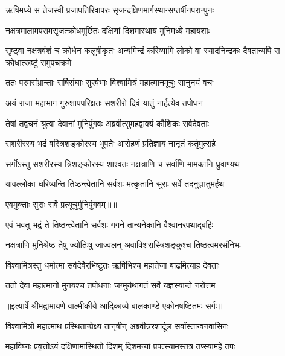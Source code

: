 \twolineshloka
{ऋषिमध्ये स तेजस्वी प्रजापतिरिवापरः}
{सृजन्दक्षिणमार्गस्थान्सप्तर्षीनपरान्पुनः} %

\twolineshloka
{नक्षत्रमालामपरामसृजत्क्रोधमूर्छितः}
{दक्षिणां दिशमास्थाय मुनिमध्ये महायशाः} %

\threelineshloka
{सृष्ट्वा नक्षत्रवंशं च क्रोधेन कलुषीकृतः}
{अन्यमिन्द्रं करिष्यामि लोको वा स्यादनिन्द्रकः}
{दैवतान्यपि स क्रोधात्स्रष्टुं समुपचक्रमे} %

\twolineshloka
{ततः परमसंभ्रान्ताः सर्षिसंघाः सुरर्षभाः}
{विश्वामित्रं महात्मानमूचुः सानुनयं वचः} %

\twolineshloka
{अयं राजा महाभाग गुरुशापपरिक्षतः}
{सशरीरो दिवं यातुं नार्हत्येव तपोधन} %

\twolineshloka
{तेषां तद्वचनं श्रुत्वा देवानां मुनिपुंगवः}
{अब्रवीत्सुमहद्वाक्यं कौशिकः सर्वदेवताः} %

\twolineshloka
{सशरीरस्य भद्रं वस्त्रिशङ्कोरस्य भूपतेः}
{आरोहणं प्रतिज्ञाय नानृतं कर्तुमुत्सहे} %

\twolineshloka
{सर्गोऽस्तु सशरीरस्य त्रिशङ्कोरस्य शाश्वतः}
{नक्षत्राणि च सर्वाणि मामकानि ध्रुवाण्यथ} %

\twolineshloka
{यावल्लोका धरिष्यन्ति तिष्ठन्त्वेतानि सर्वशः}
{मत्कृतानि सुराः सर्वे तदनुज्ञातुमर्हथ} %

{एवमुक्ताः सुराः सर्वे प्रत्यूचुर्मुनिपुंगवम्॥॥} %

\addtocounter{shlokacount}{1}

\twolineshloka
{एवं भवतु भद्रं ते तिष्ठन्त्वेतानि सर्वशः}
{गगने तान्यनेकानि वैश्वानरपथाद्बहिः} %

\twolineshloka
{नक्षत्राणि मुनिश्रेष्ठ तेषु ज्योतिःषु जाज्वलन्}
{अवाक्शिरास्त्रिशङ्कुश्च तिष्ठत्वमरसंनिभः} %

\twolineshloka
{विश्वामित्रस्तु धर्मात्मा सर्वदेवैरभिष्टुतः}
{ऋषिभिश्च महातेजा बाढमित्याह देवताः} %

\twolineshloka
{ततो देवा महात्मानो मुनयश्च तपोधनाः}
{जग्मुर्यथागतं सर्वे यज्ञस्यान्ते नरोत्तम} %


{॥इत्यार्षे श्रीमद्रामायणे वाल्मीकीये आदिकाव्ये बालकाण्डे एकोनषष्टितमः सर्गः॥}


\twolineshloka
{विश्वामित्रो महात्माथ प्रस्थितान्प्रेक्ष्य तानृषीन्}
{अब्रवीन्नरशार्दूल सर्वांस्तान्वनवासिनः} %

\twolineshloka
{महाविघ्नः प्रवृत्तोऽयं दक्षिणामास्थितो दिशम्}
{दिशमन्यां प्रपत्स्यामस्तत्र तप्स्यामहे तपः} %

